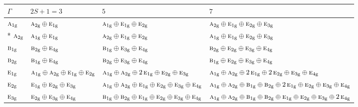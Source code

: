 \documentclass[10pt,a4paper]{article}
\numberwithin{equation}{section}
\newcommand{\irr}[1]{\text{\normalfont\scshape #1}}
\newcommand{\ptag}[1]{\mathrm{#1}}
\begin{document}
{\small\setlength{\tabcolsep}{3pt}\begin{longtable}{@{}l>{\RaggedRight\arraybackslash}p{}>{\RaggedRight\arraybackslash}p{}>{\RaggedRight\arraybackslash}p{}@{}}\toprule
$\Gamma$ & $2S + 1 = 3$ & $5$ & $7$\\\midrule\endhead
\bottomrule\endfoot\endlastfoot
$\irr{a}_{1\ptag{g}}$ & $\irr{a}_{2\ptag{g}}\oplus \irr{e}_{1\ptag{g}}$ & $\irr{a}_{1\ptag{g}}\oplus \irr{e}_{1\ptag{g}}\oplus \irr{e}_{2\ptag{g}}$ & $\irr{a}_{2\ptag{g}}\oplus \irr{e}_{1\ptag{g}}\oplus \irr{e}_{2\ptag{g}}\oplus \irr{e}_{3\ptag{g}}$\\*
$\irr{a}_{2\ptag{g}}$ & $\irr{a}_{1\ptag{g}}\oplus \irr{e}_{1\ptag{g}}$ & $\irr{a}_{2\ptag{g}}\oplus \irr{e}_{1\ptag{g}}\oplus \irr{e}_{2\ptag{g}}$ & $\irr{a}_{1\ptag{g}}\oplus \irr{e}_{1\ptag{g}}\oplus \irr{e}_{2\ptag{g}}\oplus \irr{e}_{3\ptag{g}}$\\
$\irr{b}_{1\ptag{g}}$ & $\irr{b}_{2\ptag{g}}\oplus \irr{e}_{4\ptag{g}}$ & $\irr{b}_{1\ptag{g}}\oplus \irr{e}_{3\ptag{g}}\oplus \irr{e}_{4\ptag{g}}$ & $\irr{b}_{2\ptag{g}}\oplus \irr{e}_{2\ptag{g}}\oplus \irr{e}_{3\ptag{g}}\oplus \irr{e}_{4\ptag{g}}$\\
$\irr{b}_{2\ptag{g}}$ & $\irr{b}_{1\ptag{g}}\oplus \irr{e}_{4\ptag{g}}$ & $\irr{b}_{2\ptag{g}}\oplus \irr{e}_{3\ptag{g}}\oplus \irr{e}_{4\ptag{g}}$ & $\irr{b}_{1\ptag{g}}\oplus \irr{e}_{2\ptag{g}}\oplus \irr{e}_{3\ptag{g}}\oplus \irr{e}_{4\ptag{g}}$\\
$\irr{e}_{1\ptag{g}}$ & $\irr{a}_{1\ptag{g}}\oplus \irr{a}_{2\ptag{g}}\oplus \irr{e}_{1\ptag{g}}\oplus \irr{e}_{2\ptag{g}}$ & $\irr{a}_{1\ptag{g}}\oplus \irr{a}_{2\ptag{g}}\oplus 2\,\irr{e}_{1\ptag{g}}\oplus \irr{e}_{2\ptag{g}}\oplus \irr{e}_{3\ptag{g}}$ & $\irr{a}_{1\ptag{g}}\oplus \irr{a}_{2\ptag{g}}\oplus 2\,\irr{e}_{1\ptag{g}}\oplus 2\,\irr{e}_{2\ptag{g}}\oplus \irr{e}_{3\ptag{g}}\oplus \irr{e}_{4\ptag{g}}$\\
$\irr{e}_{2\ptag{g}}$ & $\irr{e}_{1\ptag{g}}\oplus \irr{e}_{2\ptag{g}}\oplus \irr{e}_{3\ptag{g}}$ & $\irr{a}_{1\ptag{g}}\oplus \irr{a}_{2\ptag{g}}\oplus \irr{e}_{1\ptag{g}}\oplus \irr{e}_{2\ptag{g}}\oplus \irr{e}_{3\ptag{g}}\oplus \irr{e}_{4\ptag{g}}$ & $\irr{a}_{1\ptag{g}}\oplus \irr{a}_{2\ptag{g}}\oplus \irr{b}_{1\ptag{g}}\oplus \irr{b}_{2\ptag{g}}\oplus 2\,\irr{e}_{1\ptag{g}}\oplus \irr{e}_{2\ptag{g}}\oplus \irr{e}_{3\ptag{g}}\oplus \irr{e}_{4\ptag{g}}$\\
$\irr{e}_{3\ptag{g}}$ & $\irr{e}_{2\ptag{g}}\oplus \irr{e}_{3\ptag{g}}\oplus \irr{e}_{4\ptag{g}}$ & $\irr{b}_{1\ptag{g}}\oplus \irr{b}_{2\ptag{g}}\oplus \irr{e}_{1\ptag{g}}\oplus \irr{e}_{2\ptag{g}}\oplus \irr{e}_{3\ptag{g}}\oplus \irr{e}_{4\ptag{g}}$ & $\irr{a}_{1\ptag{g}}\oplus \irr{a}_{2\ptag{g}}\oplus \irr{b}_{1\ptag{g}}\oplus \irr{b}_{2\ptag{g}}\oplus \irr{e}_{1\ptag{g}}\oplus \irr{e}_{2\ptag{g}}\oplus \irr{e}_{3\ptag{g}}\oplus 2\,\irr{e}_{4\ptag{g}}$\\

\end{longtable}}
\end{document}
